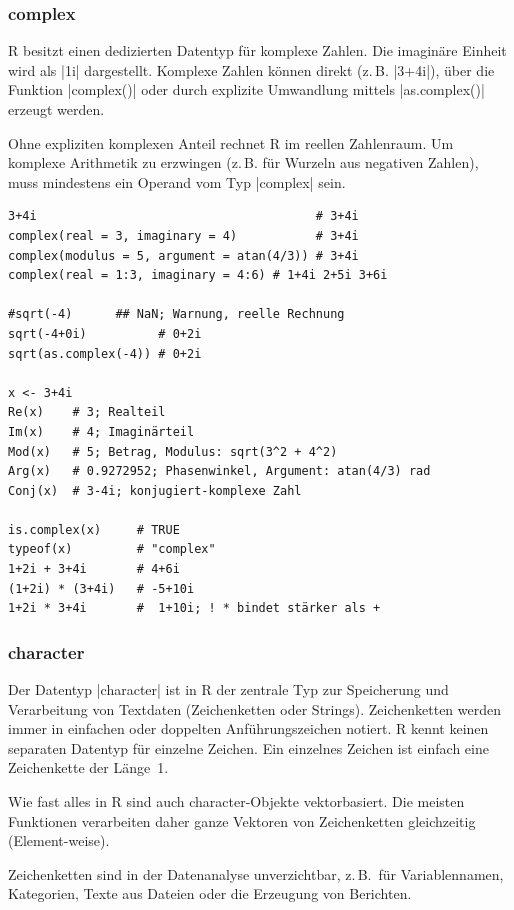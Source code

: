 \documentclass[10pt,twocolumn]{scrartcl}
\renewcommand{\lstinline}{\mycoloredinline}
\begin{document}
\subsubsection{complex}

R besitzt einen dedizierten Datentyp für komplexe Zahlen. Die imaginäre Einheit wird als \lstinline|1i| dargestellt. Komplexe Zahlen können direkt (z.\,B. \lstinline|3+4i|), über die Funktion \lstinline|complex()| oder durch explizite Umwandlung mittels \lstinline|as.complex()| erzeugt werden. 

Ohne expliziten komplexen Anteil rechnet R im reellen Zahlenraum. Um komplexe Arithmetik zu erzwingen (z.\,B. für Wurzeln aus negativen Zahlen), muss mindestens ein Operand vom Typ \lstinline|complex| sein.

\begin{lstlisting}
3+4i                                       # 3+4i
complex(real = 3, imaginary = 4)           # 3+4i
complex(modulus = 5, argument = atan(4/3)) # 3+4i
complex(real = 1:3, imaginary = 4:6) # 1+4i 2+5i 3+6i

#sqrt(-4)      ## NaN; Warnung, reelle Rechnung
sqrt(-4+0i)          # 0+2i
sqrt(as.complex(-4)) # 0+2i

x <- 3+4i
Re(x)    # 3; Realteil
Im(x)    # 4; Imaginärteil
Mod(x)   # 5; Betrag, Modulus: sqrt(3^2 + 4^2)
Arg(x)   # 0.9272952; Phasenwinkel, Argument: atan(4/3) rad
Conj(x)  # 3-4i; konjugiert-komplexe Zahl

is.complex(x)     # TRUE
typeof(x)         # "complex"
1+2i + 3+4i       # 4+6i
(1+2i) * (3+4i)   # -5+10i
1+2i * 3+4i       #  1+10i; ! * bindet stärker als +
\end{lstlisting}


\subsubsection{character}

Der Datentyp \lstinline|character| ist in R der zentrale Typ zur Speicherung und Verarbeitung von Textdaten (Zeichenketten oder Strings). Zeichenketten werden immer in einfachen oder doppelten Anführungszeichen notiert. R kennt keinen separaten Datentyp für einzelne Zeichen. Ein einzelnes Zeichen ist einfach eine Zeichenkette der Länge~1.

Wie fast alles in R sind auch character-Objekte vektorbasiert. Die meisten Funktionen verarbeiten daher ganze Vektoren von Zeichenketten gleichzeitig (Element-weise).

Zeichenketten sind in der Datenanalyse unverzichtbar, z.\,B.\ für Variablennamen, Kategorien, Texte aus Dateien oder die Erzeugung von Berichten.
\end{document}
